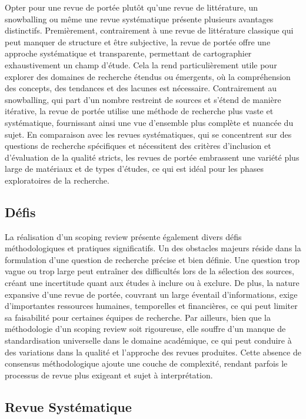 \documentclass[
  letterpaper,
  DIV=11,
  numbers=noendperiod]{scrreprt}
\begin{document}
Opter pour une revue de portée plutôt qu'une revue de littérature, un
snowballing ou même une revue systématique présente plusieurs avantages
distinctifs. Premièrement, contrairement à une revue de littérature
classique qui peut manquer de structure et être subjective, la revue de
portée offre une approche systématique et transparente, permettant de
cartographier exhaustivement un champ d'étude. Cela la rend
particulièrement utile pour explorer des domaines de recherche étendus
ou émergents, où la compréhension des concepts, des tendances et des
lacunes est nécessaire. Contrairement au snowballing, qui part d'un
nombre restreint de sources et s'étend de manière itérative, la revue de
portée utilise une méthode de recherche plus vaste et systématique,
fournissant ainsi une vue d'ensemble plus complète et nuancée du sujet.
En comparaison avec les revues systématiques, qui se concentrent sur des
questions de recherche spécifiques et nécessitent des critères
d'inclusion et d'évaluation de la qualité stricts, les revues de portée
embrassent une variété plus large de matériaux et de types d'études, ce
qui est idéal pour les phases exploratoires de la recherche.

\subsection{Défis}\label{duxe9fis-1}

La réalisation d'un scoping review présente également divers défis
méthodologiques et pratiques significatifs. Un des obstacles majeurs
réside dans la formulation d'une question de recherche précise et bien
définie. Une question trop vague ou trop large peut entraîner des
difficultés lors de la sélection des sources, créant une incertitude
quant aux études à inclure ou à exclure. De plus, la nature expansive
d'une revue de portée, couvrant un large éventail d'informations, exige
d'importantes ressources humaines, temporelles et financières, ce qui
peut limiter sa faisabilité pour certaines équipes de recherche. Par
ailleurs, bien que la méthodologie d'un scoping review soit rigoureuse,
elle souffre d'un manque de standardisation universelle dans le domaine
académique, ce qui peut conduire à des variations dans la qualité et
l'approche des revues produites. Cette absence de consensus
méthodologique ajoute une couche de complexité, rendant parfois le
processus de revue plus exigeant et sujet à interprétation.

\subsection{Revue Systématique}\label{revue-systuxe9matique}
\end{document}
